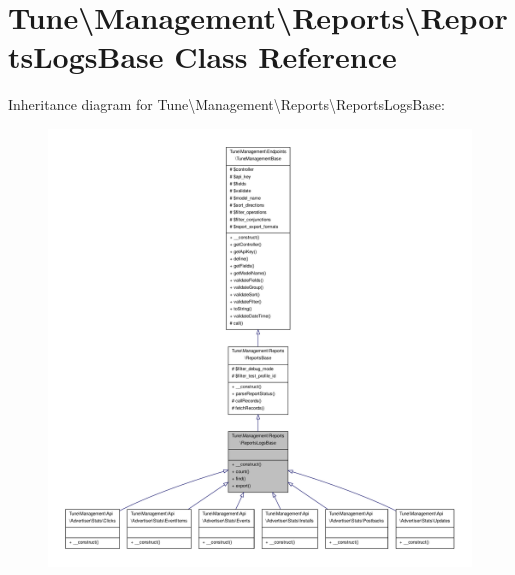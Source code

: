 \hypertarget{classTune_1_1Management_1_1Reports_1_1ReportsLogsBase}{\section{Tune\textbackslash{}Management\textbackslash{}Reports\textbackslash{}Reports\-Logs\-Base Class Reference}
\label{classTune_1_1Management_1_1Reports_1_1ReportsLogsBase}
}


Inheritance diagram for Tune\textbackslash{}Management\textbackslash{}Reports\textbackslash{}Reports\-Logs\-Base\-:
\nopagebreak
\begin{figure}[H]
\begin{center}
\leavevmode
\includegraphics[width=350pt]{classTune_1_1Management_1_1Reports_1_1ReportsLogsBase__inherit__graph}
\end{center}
\end{figure}


